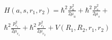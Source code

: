 %
%

\begin{multline}
	H(a, s, r_1, r_2) = \hbar^{2} \frac{p_{a}^2}{2 \mu_{a}} + \hbar^{2} \frac{p_{s}^2}{2 \mu_{s}} + \\
		\hbar^{2} \frac{p_{r_1}^2}{2 \mu_{r_1}} + \hbar^{2} \frac{p_{r_2}^2}{2 \mu_{r_2}} + V(R_1, R_2, r_1, r_2)
\label{eq:hamm}
\end{multline}
%
%
